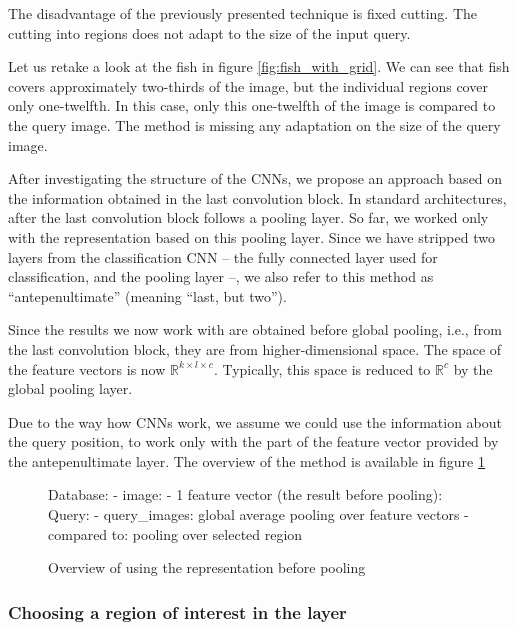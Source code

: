 The disadvantage of the previously presented technique is fixed cutting. The cutting into regions does not adapt to the size of the input query. 

Let us retake a look at the fish in figure \ref{fig:fish_with_grid}. We can see that fish covers approximately two-thirds of the image, but the individual regions cover only one-twelfth. In this case, only this one-twelfth of the image is compared to the query image. The method is missing any adaptation on the size of the query image.

After investigating the structure of the CNNs, we propose an approach based on the information obtained in the last convolution block. In standard architectures, after the last convolution block follows a pooling layer. So far, we worked only with the representation based on this pooling layer. Since we have stripped two layers from the classification CNN -- the fully connected layer used for classification, and the pooling layer --, we also refer to this method as ``antepenultimate'' (meaning ``last, but two'').

Since the results we now work with are obtained before global pooling, i.e., from the last convolution block, they are from higher-dimensional space. The space of the feature vectors is now $\mathbb{R}^{k\times l \times c}$. Typically, this space is reduced to $\mathbb{R}^c$ by the global pooling layer.

Due to the way how CNNs work, we assume we could use the information about the query position, to work only with the part of the feature vector provided by the antepenultimate layer. The overview of the method is available in figure \ref{fig:antepenultimate_overview}

\begin{figure}
\centering
\begin{boxedverbatim}
Database:
    - image:
        - 1 feature vector (the result before pooling):
Query:
    - query_images: global average pooling over feature vectors
    - compared to: pooling over selected region
\end{boxedverbatim}
\caption{Overview of using the representation before pooling}
\label{fig:antepenultimate_overview}
\end{figure}


\subsubsection{Choosing a region of interest in the layer}

